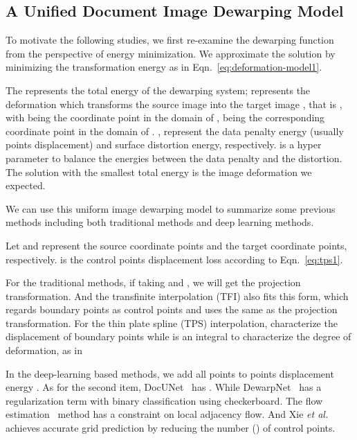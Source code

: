 \documentclass[10pt,twocolumn,letterpaper]{article}
\begin{document}
\subsection{A Unified Document Image Dewarping Model}
To motivate the following studies, we first re-examine the dewarping function from the perspective of energy minimization. We approximate the solution by minimizing the transformation energy as in Eqn.~\eqref{eq:deformation-model1}. 
\vspace{-0.5em}




The  represents the total energy of the dewarping system;  represents the deformation which transforms the source image  into the target image , that is , with  being the coordinate point in the domain of ,  being the corresponding coordinate point in the domain of . ,  represent the data penalty energy (usually points displacement) and surface distortion energy, respectively.  is a hyper parameter to balance the energies between the data penalty and the distortion. The solution with the smallest total energy is the image deformation we expected. 

We can use this uniform image dewarping model to summarize some previous methods including both traditional methods and deep learning methods.

Let  and  represent the source coordinate points and the target coordinate points, respectively.  is the control points displacement loss according to Eqn.~\eqref{eq:tps1}.
\vspace{-0.5em}


For the traditional methods, if taking  and , we will get the projection transformation. And the transfinite interpolation (TFI) also fits this form, which regards boundary points as control points and uses the same  as the projection transformation. For the thin plate spline (TPS) interpolation,  characterize the displacement of boundary points while  is an integral to characterize the degree of deformation, as in



In the deep-learning based methods, we add all points to points displacement energy . As for the second item, DocUNet~\cite{Ma_2018_CVPR} has . While DewarpNet~\cite{Das_2019_ICCV} has a regularization term with binary classification using checkerboard. The flow estimation~\cite{xie2020dewarping} method has a constraint on local adjacency flow. And Xie {\em et al.}~\cite{xie2021document} achieves accurate grid prediction by reducing the number () of control points.
\end{document}
